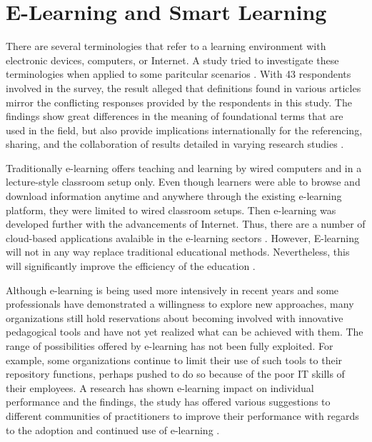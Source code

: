 \documentclass[journal]{vgtc}                %
\begin{document}

\section{E-Learning and Smart Learning}
There are several terminologies that refer to a learning environment with electronic devices, computers, or Internet. A study tried to investigate these terminologies when applied to some paritcular scenarios \cite{Moore2011}. With 43 respondents involved in the survey, the result alleged that definitions found in various articles mirror the conflicting responses provided by the respondents in this study. The findings show great differences in the meaning of foundational terms that are used in the field, but also provide implications internationally for the referencing, sharing, and the collaboration of results detailed in varying research studies \cite{Moore2011}.

Traditionally e-learning offers teaching and learning by wired computers and in a lecture-style classroom setup only. Even though learners were able to browse and download information anytime and anywhere through the existing e-learning platform, they were limited to wired classroom setups. Then e-learning was developed further with the advancements of Internet. Thus, there are a number of cloud-based applications avalaible in the e-learning sectors \cite{s110807835}. However, E-learning will not in any way replace traditional educational methods. Nevertheless, this will significantly improve the efficiency of the education \cite{SudhirKumarSharmaNidhiGoyal2014}.

Although e-learning is being used more intensively in recent years and some professionals have demonstrated a willingness to explore new approaches, many organizations still hold reservations about becoming involved with innovative pedagogical tools and have not yet realized what can be achieved with them. The range of possibilities offered by e-learning has not been fully exploited. For example, some organizations continue to limit their use of such tools to their repository functions, perhaps pushed to do so because of the poor IT skills of their employees. A research has shown e-learning impact on individual performance and the findings, the study has offered various suggestions to different communities of practitioners to improve their performance with regards to the adoption and continued use of e-learning \cite{Mohammadyari2014}. 
\end{document}
